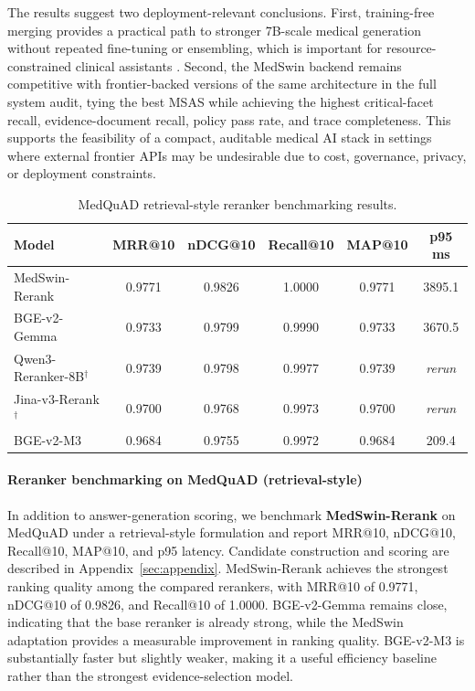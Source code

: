\documentclass[conference]{IEEEtran}
\begin{document}
The results suggest two deployment-relevant conclusions. First, training-free merging provides a practical path to stronger 7B-scale medical generation without repeated fine-tuning or ensembling, which is important for resource-constrained clinical assistants \cite{wortsman2022soups,goddard2024arcee}. Second, the MedSwin backend remains competitive with frontier-backed versions of the same architecture in the full system audit, tying the best MSAS while achieving the highest critical-facet recall, evidence-document recall, policy pass rate, and trace completeness. This supports the feasibility of a compact, auditable medical AI stack in settings where external frontier APIs may be undesirable due to cost, governance, privacy, or deployment constraints.

\begin{table}[h!]
\centering
\caption{MedQuAD retrieval-style reranker benchmarking results.}
\label{tab:medquad_rerank_bench}
\footnotesize 
\setlength{\tabcolsep}{1.5pt} 
\begin{tabular}{lccccc}
\toprule
Model & MRR@10 & nDCG@10 & Recall@10 & MAP@10 & p95 ms \\
\midrule
MedSwin-Rerank & 0.9771 & 0.9826 & 1.0000 & 0.9771 & 3895.1 \\
BGE-v2-Gemma & 0.9733 & 0.9799 & 0.9990 & 0.9733 & 3670.5 \\
Qwen3-Reranker-8B$^\dagger$ & 0.9739 & 0.9798 & 0.9977 & 0.9739 & \textit{rerun} \\
Jina-v3-Rerank$^\dagger$ & 0.9700 & 0.9768 & 0.9973 & 0.9700 & \textit{rerun} \\
BGE-v2-M3 & 0.9684 & 0.9755 & 0.9972 & 0.9684 & 209.4 \\
\bottomrule
\end{tabular}
\end{table}

\paragraph{Reranker benchmarking on MedQuAD (retrieval-style)}
In addition to answer-generation scoring, we benchmark \textbf{MedSwin-Rerank} on MedQuAD under a retrieval-style formulation and report MRR@10, nDCG@10, Recall@10, MAP@10, and p95 latency. Candidate construction and scoring are described in Appendix~\ref{sec:appendix}. MedSwin-Rerank achieves the strongest ranking quality among the compared rerankers, with MRR@10 of 0.9771, nDCG@10 of 0.9826, and Recall@10 of 1.0000. BGE-v2-Gemma remains close, indicating that the base reranker is already strong, while the MedSwin adaptation provides a measurable improvement in ranking quality. BGE-v2-M3 is substantially faster but slightly weaker, making it a useful efficiency baseline rather than the strongest evidence-selection model.
\end{document}
